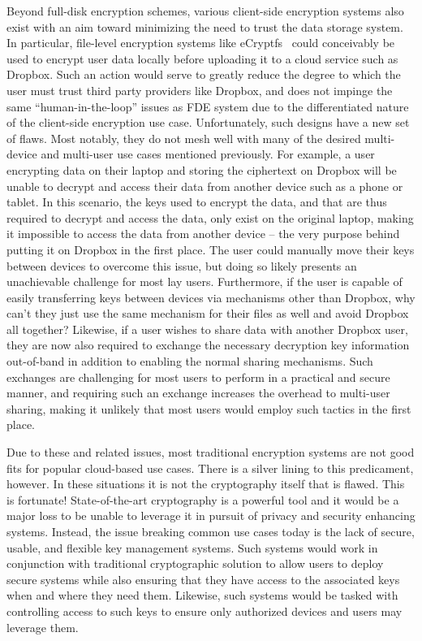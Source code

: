 Beyond full-disk encryption schemes, various client-side encryption
systems also exist with an aim toward minimizing the need to trust the
data storage system. In particular, file-level encryption systems like
eCryptfs~\cite{ecryptfs} could conceivably be used to encrypt user
data locally before uploading it to a cloud service such as
Dropbox. Such an action would serve to greatly reduce the degree to
which the user must trust third party providers like Dropbox, and does
not impinge the same ``human-in-the-loop'' issues as FDE system due to
the differentiated nature of the client-side encryption use
case. Unfortunately, such designs have a new set of flaws. Most
notably, they do not mesh well with many of the desired multi-device
and multi-user use cases mentioned previously. For example, a user
encrypting data on their laptop and storing the ciphertext on Dropbox
will be unable to decrypt and access their data from another device
such as a phone or tablet. In this scenario, the keys used to encrypt
the data, and that are thus required to decrypt and access the data,
only exist on the original laptop, making it impossible to access the
data from another device -- the very purpose behind putting it on
Dropbox in the first place. The user could manually move their keys
between devices to overcome this issue, but doing so likely presents
an unachievable challenge for most lay users. Furthermore, if the user
is capable of easily transferring keys between devices via mechanisms
other than Dropbox, why can't they just use the same mechanism for
their files as well and avoid Dropbox all together? Likewise, if a
user wishes to share data with another Dropbox user, they are now also
required to exchange the necessary decryption key information
out-of-band in addition to enabling the normal sharing
mechanisms. Such exchanges are challenging for most users to perform
in a practical and secure manner, and requiring such an exchange
increases the overhead to multi-user sharing, making it unlikely that
most users would employ such tactics in the first place.

Due to these and related issues, most traditional encryption systems
are not good fits for popular cloud-based use cases. There is a silver
lining to this predicament, however. In these situations it is not the
cryptography itself that is flawed. This is fortunate!
State-of-the-art cryptography is a powerful tool and it would be a
major loss to be unable to leverage it in pursuit of privacy and
security enhancing systems. Instead, the issue breaking common use
cases today is the lack of secure, usable, and flexible key management
systems. Such systems would work in conjunction with traditional
cryptographic solution to allow users to deploy secure systems while
also ensuring that they have access to the associated keys when and
where they need them. Likewise, such systems would be tasked with
controlling access to such keys to ensure only authorized devices and
users may leverage them.

